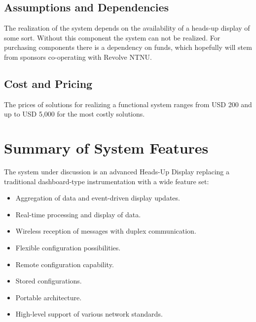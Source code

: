 \subsection{Assumptions and Dependencies}
The realization of the system depends on the availability of a heads-up display
of some sort. Without this component the system can not be realized. For
purchasing components there is a dependency on funds, which hopefully will
stem from sponsors co-operating with Revolve NTNU. 

\subsection{Cost and Pricing}
The prices of solutions for realizing a functional system ranges from USD 200
and up to USD 5,000 for the most costly solutions. 

\section{Summary of System Features}
The system under discussion is an advanced Heads-Up Display replacing a 
traditional dashboard-type instrumentation with a wide feature set:
\begin{itemize}
	\item Aggregation of data and event-driven display updates.
	\item Real-time processing and display of data.
	\item Wireless reception of messages with duplex communication.
	\item Flexible configuration possibilities.
	\item Remote configuration capability.
	\item Stored configurations.
	\item Portable architecture.
	\item High-level support of various network
	standards.
\end{itemize}
